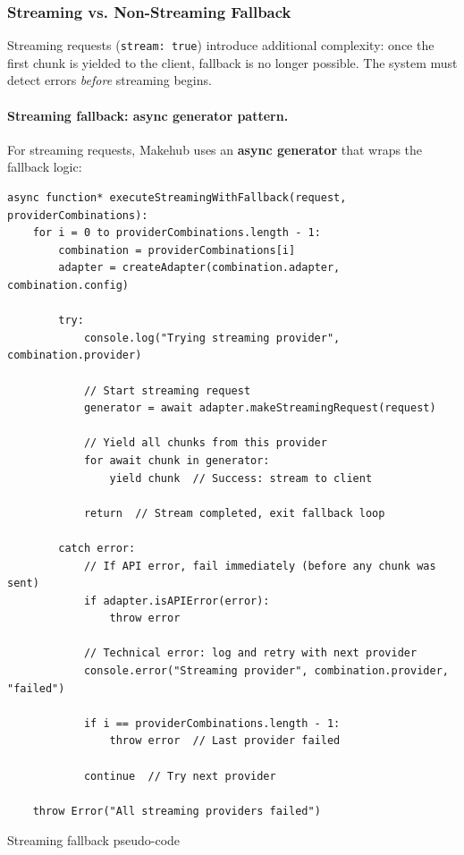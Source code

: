\documentclass[english]{article}
\begin{document}
\subsubsection{Streaming vs. Non-Streaming Fallback}

Streaming requests (\texttt{stream: true}) introduce additional complexity: once the first chunk is yielded to the client, fallback is no longer possible. The system must detect errors \emph{before} streaming begins.

\paragraph{Streaming fallback: async generator pattern.}

For streaming requests, Makehub uses an \textbf{async generator} that wraps the fallback logic:

\begin{listing}[H]
\begin{verbatim}
async function* executeStreamingWithFallback(request, providerCombinations):
    for i = 0 to providerCombinations.length - 1:
        combination = providerCombinations[i]
        adapter = createAdapter(combination.adapter, combination.config)

        try:
            console.log("Trying streaming provider", combination.provider)

            // Start streaming request
            generator = await adapter.makeStreamingRequest(request)

            // Yield all chunks from this provider
            for await chunk in generator:
                yield chunk  // Success: stream to client

            return  // Stream completed, exit fallback loop

        catch error:
            // If API error, fail immediately (before any chunk was sent)
            if adapter.isAPIError(error):
                throw error

            // Technical error: log and retry with next provider
            console.error("Streaming provider", combination.provider, "failed")

            if i == providerCombinations.length - 1:
                throw error  // Last provider failed

            continue  // Try next provider

    throw Error("All streaming providers failed")
\end{verbatim}
\caption{Streaming fallback pseudo-code}
\end{listing}
\end{document}
